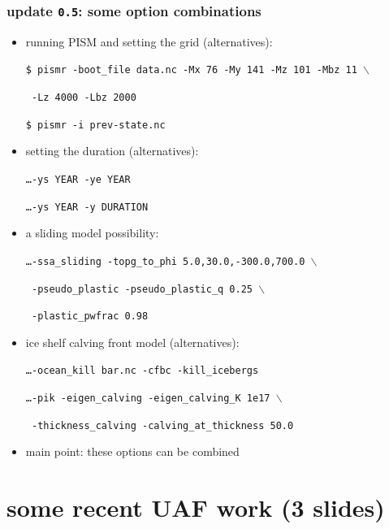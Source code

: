 \documentclass[hide notes,intlimits]{beamer}
\begin{document}
\begin{frame}
  \frametitle{update \texttt{0.5}: some option combinations}
  \begin{itemize}
  \item running PISM and setting the grid (alternatives):
    \small

    \texttt{\$ pismr -boot\_file data.nc -Mx 76 -My 141 -Mz 101 -Mbz 11 $\backslash$}
    
    \texttt{\phantom{foobar} -Lz 4000 -Lbz 2000}

    \texttt{\$ pismr -i prev-state.nc}
    \normalsize
  \item setting the duration (alternatives):
    \small

    \texttt{\dots\quad -ys YEAR -ye YEAR}
    
    \texttt{\dots\quad -ys YEAR -y DURATION}
    \normalsize
  \item a sliding model possibility:
    \small

    \texttt{\dots\quad -ssa\_sliding -topg\_to\_phi 5.0,30.0,-300.0,700.0 $\backslash$}
    
    \texttt{\phantom{foobar} -pseudo\_plastic -pseudo\_plastic\_q 0.25 $\backslash$}
    
    \texttt{\phantom{foobar} -plastic\_pwfrac 0.98 }
    \normalsize

  \item ice shelf calving front model (alternatives):
    \small

    \texttt{\dots\quad -ocean\_kill bar.nc -cfbc -kill\_icebergs}

    \texttt{\dots\quad -pik -eigen\_calving -eigen\_calving\_K 1e17 $\backslash$}
    
    \texttt{\phantom{foobar} -thickness\_calving -calving\_at\_thickness 50.0}
    \normalsize
  \item \alert{main point:}  these options can be combined
  \end{itemize}
\end{frame}


\section[UAF work]{some recent UAF work (3 slides)}
\end{document}
